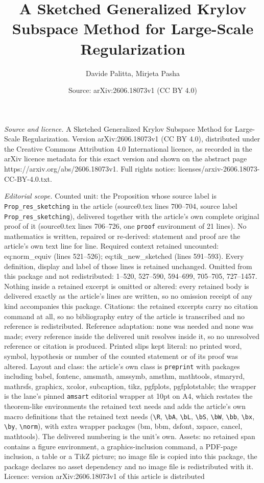 \documentclass[10pt,a4paper]{amsart}
\title[A Sketched Generalized Krylov Subspace Method for Large-Scal]{A Sketched Generalized Krylov Subspace Method for Large-Scale Regularization}
\author{Davide Palitta, Mirjeta Pasha}
\date{Source: arXiv:2606.18073v1 (CC BY 4.0)}
\begin{document}
\maketitle

\noindent\emph{Source and licence.} A Sketched Generalized Krylov Subspace Method for Large-Scale Regularization. Version arXiv:2606.18073v1 (CC BY 4.0), distributed under the Creative Commons Attribution 4.0 International licence, as recorded in the arXiv licence metadata for this exact version and shown on the abstract page https://arxiv.org/abs/2606.18073v1. Full rights notice: licenses/arxiv-2606.18073-CC-BY-4.0.txt.\par\smallskip

\noindent\textit{Editorial scope.} Counted unit: the Proposition whose source label is \texttt{Prop\_res\_sketching} in the article (source0.tex lines 700--704, source label \texttt{Prop\_res\_sketching}), delivered together with the article's own complete original proof of it (source0.tex lines 706--726, one \texttt{proof} environment of 21 lines). No mathematics is written, repaired or re-derived: statement and proof are the article's own text line for line. Required context retained uncounted: eq:norm\_equiv (lines 521--526); eq:tik\_new\_sketched (lines 591--593). Every definition, display and label of those lines is retained unchanged. Omitted from this package and not redistributed: 1--520, 527--590, 594--699, 705--705, 727--1457. Nothing inside a retained excerpt is omitted or altered: every retained body is delivered exactly as the article's lines are written, so no omission receipt of any kind accompanies this package. Citations: the retained excerpts carry no citation command at all, so no bibliography entry of the article is transcribed and no reference is redistributed. Reference adaptation: none was needed and none was made; every reference inside the delivered unit resolves inside it, so no unresolved reference or citation is produced. Printed slips kept literal: no printed word, symbol, hypothesis or number of the counted statement or of its proof was altered. Layout and class: the article's own class is \texttt{preprint} with packages including babel, fontenc, amsmath, amssymb, amsthm, mathtools, stmaryrd, mathrsfs, graphicx, xcolor, subcaption, tikz, pgfplots, pgfplotstable; the wrapper is the lane's pinned \texttt{amsart} editorial wrapper at 10pt on A4, which restates the theorem-like environments the retained text needs and adds the article's own macro definitions that the retained text needs (\texttt{\textbackslash R}, \texttt{\textbackslash bA}, \texttt{\textbackslash bL}, \texttt{\textbackslash bS}, \texttt{\textbackslash bW}, \texttt{\textbackslash bb}, \texttt{\textbackslash bx}, \texttt{\textbackslash by}, \texttt{\textbackslash norm}), with extra wrapper packages (bm, bbm, dsfont, xspace, cancel, mathtools). The delivered numbering is the unit's own. Assets: no retained span contains a figure environment, a graphics-inclusion command, a PDF-page inclusion, a table or a TikZ picture; no image file is copied into this package, the package declares no asset dependency and no image file is redistributed with it. Licence: version arXiv:2606.18073v1 of this article is distributed 
\end{document}
